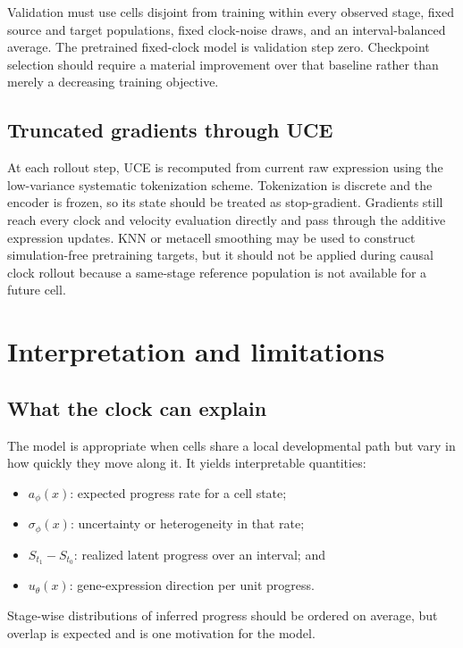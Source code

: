 \documentclass[11pt]{article}
\newcommand{\uce}{UCE}
\begin{document}
Validation must use cells disjoint from training within every observed stage,
fixed source and target populations, fixed clock-noise draws, and an
interval-balanced average. The pretrained fixed-clock model is validation
step zero. Checkpoint selection should require a material improvement over
that baseline rather than merely a decreasing training objective.

\subsection{Truncated gradients through UCE}

At each rollout step, \uce{} is recomputed from current raw expression using
the low-variance systematic tokenization scheme. Tokenization is discrete and
the encoder is frozen, so its state should be treated as stop-gradient.
Gradients still reach every clock and velocity evaluation directly and pass
through the additive expression updates. KNN or metacell smoothing may be used
to construct simulation-free pretraining targets, but it should not be applied
during causal clock rollout because a same-stage reference population is not
available for a future cell.

\section{Interpretation and limitations}

\subsection{What the clock can explain}

The model is appropriate when cells share a local developmental path but vary
in how quickly they move along it. It yields interpretable quantities:
\begin{itemize}
  \item $a_\phi(x)$: expected progress rate for a cell state;
  \item $\sigma_\phi(x)$: uncertainty or heterogeneity in that rate;
  \item $S_{t_1}-S_{t_0}$: realized latent progress over an interval; and
  \item $u_\theta(x)$: gene-expression direction per unit progress.
\end{itemize}
Stage-wise distributions of inferred progress should be ordered on average,
but overlap is expected and is one motivation for the model.
\end{document}
